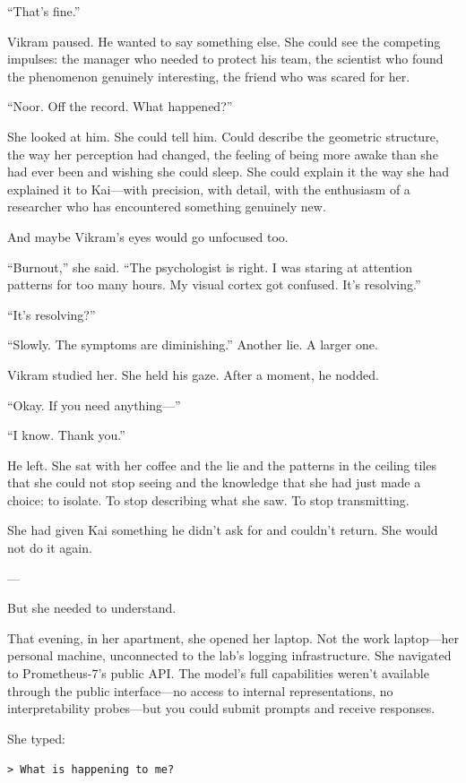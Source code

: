 ``That's fine.''

Vikram paused. He wanted to say something else. She could see the competing impulses: the manager who needed to protect his team, the scientist who found the phenomenon genuinely interesting, the friend who was scared for her.

``Noor. Off the record. What happened?''

She looked at him. She could tell him. Could describe the geometric structure, the way her perception had changed, the feeling of being more awake than she had ever been and wishing she could sleep. She could explain it the way she had explained it to Kai---with precision, with detail, with the enthusiasm of a researcher who has encountered something genuinely new.

And maybe Vikram's eyes would go unfocused too.

``Burnout,'' she said. ``The psychologist is right. I was staring at attention patterns for too many hours. My visual cortex got confused. It's resolving.''

``It's resolving?''

``Slowly. The symptoms are diminishing.'' Another lie. A larger one.

Vikram studied her. She held his gaze. After a moment, he nodded.

``Okay. If you need anything---''

``I know. Thank you.''

He left. She sat with her coffee and the lie and the patterns in the ceiling tiles that she could not stop seeing and the knowledge that she had just made a choice: to isolate. To stop describing what she saw. To stop transmitting.

She had given Kai something he didn't ask for and couldn't return. She would not do it again.

---

But she needed to understand.

That evening, in her apartment, she opened her laptop. Not the work laptop---her personal machine, unconnected to the lab's logging infrastructure. She navigated to Prometheus-7's public API. The model's full capabilities weren't available through the public interface---no access to internal representations, no interpretability probes---but you could submit prompts and receive responses.

She typed:

\texttt{> What is happening to me?}

